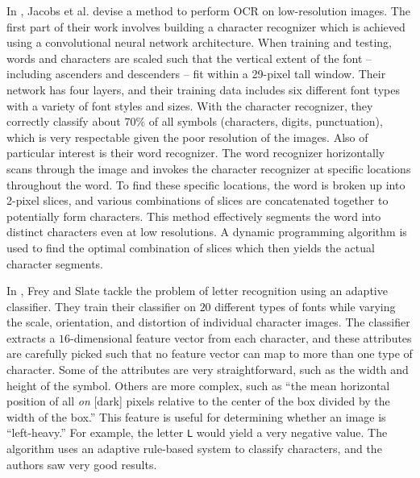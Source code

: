 \documentclass[10pt]{IEEEtran}
\begin{document}
In \cite{1}, Jacobs et al. devise a method to perform OCR on low-resolution images. The first part of their work involves building a character recognizer which is achieved using a convolutional neural network architecture. When training and testing, words and characters are scaled such that the vertical extent of the font -- including ascenders and descenders -- fit within a 29-pixel tall window. Their network has four layers, and their training data includes six different font types with a variety of font styles and sizes. With the character recognizer, they  correctly classify about 70\% of all symbols (characters, digits, punctuation), which is very respectable given the poor resolution of the images. Also of particular interest is their word recognizer. The word recognizer horizontally scans through the image and invokes the character recognizer at specific locations throughout the word. To find these specific locations, the word is broken up into 2-pixel slices, and various combinations of slices are concatenated together to potentially form characters. This method effectively segments the word into distinct characters even at low resolutions. A dynamic programming algorithm is used to find the optimal combination of slices which then yields the actual character segments.

In \cite{2}, Frey and Slate tackle the problem of letter recognition using an adaptive classifier. They train their classifier on $20$ different types of fonts while varying the scale, orientation, and distortion of individual character images. The classifier extracts a $16$-dimensional feature vector from each character, and these attributes are carefully picked such that no feature vector can map to more than one type of character. Some of the attributes are very straightforward, such as the width and height of the symbol. Others are more complex, such as ``the mean horizontal position of all \textit{on} [dark] pixels relative to the center of the box
divided by the width of the box.'' This feature is useful for determining whether an image is ``left-heavy.'' For example, the letter \texttt{L} would yield a very negative value. The algorithm uses an adaptive rule-based system to classify characters, and the authors saw very good results.
\end{document}
